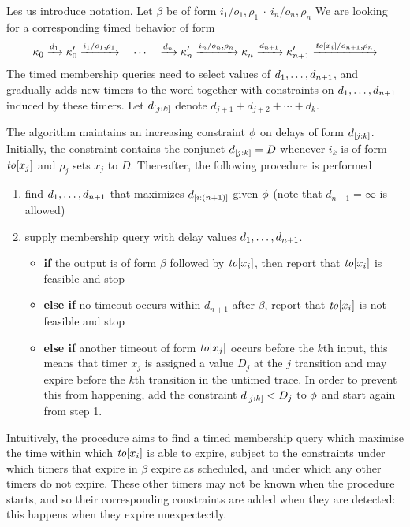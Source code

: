 Les us introduce notation. Let $\beta$ be of form
\(
  {i_1/o_1, \rho_1} \ \cdot \ {i_n/o_n, \rho_n}
\)
We are looking for a corresponding timed behavior of form 
\[
\kappa_0 \xrightarrow{d_1} \kappa'_0 \xrightarrow{i_1/o_1, \rho_1}
\quad \cdots \quad
\xrightarrow{d_n} \kappa'_n \xrightarrow{i_n/o_n, \rho_n} \kappa_n
\xrightarrow{d_{n+1}} \kappa'_{n+1} \xrightarrow{\mathit{to}[x_i]/o_{n+1}, \rho_n}
\]
The timed membership queries need to select values
of ${d}_1 , \ldots , {d}_{n+1}$, and gradually adds new timers to the word together
with constraints on ${d}_1 , \ldots , {d}_{n+1}$ induced by these timers.
Let $d_{[j:k]}$ denote $d_{j+1} + d_{j+2} + \cdots + d_k$.

The algorithm maintains an increasing constraint $\phi$ on delays of form
$d_{[j:k]}$. Initially, the constraint contains the conjunct
$d_{[j:k]} = D$ whenever $i_k$ is of form $\mathit{to}[x_j]$ and
$\rho_j$ sets $x_j$ to $D$.
Thereafter, the following procedure is performed
  \begin{enumerate}
  \item
    find ${d}_1 , \ldots , {d}_{{n+1}}$ that maximizes $d_{[i:(n+1)]}$ given
    $\phi$ (note that $d_{n+1} = \infty$ is allowed)
  \item
    supply membership query with delay values ${d}_1 , \ldots , {d}_{{n+1}}$.
\begin{itemize}
  \item
    {\bf if} the output is of form $\beta$ followed by $\mathit{to}[x_i]$, then
    report that $\mathit{to}[x_i]$ is feasible and stop
  \item
    {\bf else if} no timeout occurs within $d_{n+1}$ after $\beta$, report
    that $\mathit{to}[x_i]$ is not feasible and stop
  \item
    {\bf else if} another timeout of form $\mathit{to}[x_j]$ occurs before
    the $k$th input, this means that timer $x_j$ is assigned a value
    $D_j$ at the $j$ transition and may expire before the $k$th transition
    in the untimed trace. In order to prevent this from happening,
    add the constraint $d_{[j:k]} < D_j$ to $\phi$ and start again
    from step 1.
\end{itemize}
  \end{enumerate}
  Intuitively, the procedure aims to find a timed membership query which maximise
  the time within which $\mathit{to}[x_i]$ is able to expire,
  subject to the constraints under which timers that expire in $\beta$ expire
  as scheduled, and under which any other timers do not expire. These
  other timers may not be known when the procedure starts, and so their
  corresponding constraints are added when they are detected: this happens
  when they expire unexpectectly.


